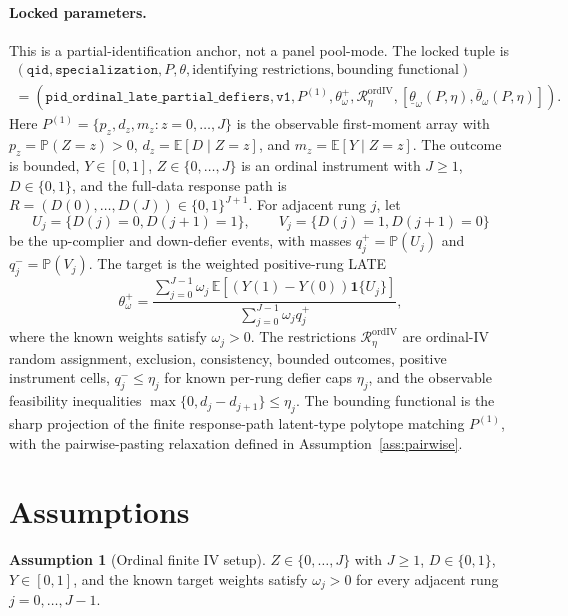 \documentclass[11pt]{article}
\newcommand{\E}{\mathbb{E}}
\renewcommand{\Pr}{\mathbb{P}}
\newcommand{\one}{\mathbf{1}}
\theoremstyle{definition}
\newtheorem{assumption}{Assumption}
\theoremstyle{plain}
\theoremstyle{remark}
\begin{document}
\paragraph{Locked parameters.}
This is a partial-identification anchor, not a panel pool-mode.  The locked
tuple is
\[
\begin{gathered}
(\texttt{qid},\texttt{specialization},P,\theta,\text{identifying restrictions},
  \text{bounding functional})\\
=
(\texttt{pid\_ordinal\_late\_partial\_defiers},\texttt{v1},
  P^{(1)},\theta^+_\omega,\mathcal R_{\eta}^{\mathrm{ordIV}},
  [\underline\theta_\omega(P,\eta),\overline\theta_\omega(P,\eta)]) .
\end{gathered}
\]
Here \(P^{(1)}=\{p_z,d_z,m_z:z=0,\ldots,J\}\) is the observable first-moment
array with \(p_z=\Pr(Z=z)>0\), \(d_z=\E[D\mid Z=z]\), and
\(m_z=\E[Y\mid Z=z]\).  The outcome is bounded, \(Y\in[0,1]\),
\(Z\in\{0,\ldots,J\}\) is an ordinal instrument with \(J\ge 1\),
\(D\in\{0,1\}\), and the full-data response path is
\(R=(D(0),\ldots,D(J))\in\{0,1\}^{J+1}\).  For adjacent rung \(j\), let
\[
U_j=\{D(j)=0,D(j+1)=1\},\qquad V_j=\{D(j)=1,D(j+1)=0\}
\]
be the up-complier and down-defier events, with masses \(q^+_j=\Pr(U_j)\) and
\(q^-_j=\Pr(V_j)\).  The target is the weighted positive-rung LATE
\[
\theta^+_\omega
=\frac{\sum_{j=0}^{J-1}\omega_j\,\E[(Y(1)-Y(0))\one\{U_j\}]}
        {\sum_{j=0}^{J-1}\omega_j q^+_j},
\]
where the known weights satisfy \(\omega_j>0\).  The restrictions
\(\mathcal R_{\eta}^{\mathrm{ordIV}}\) are ordinal-IV random assignment,
exclusion, consistency, bounded outcomes, positive instrument cells,
\(q^-_j\le \eta_j\) for known per-rung defier caps \(\eta_j\), and the
observable feasibility inequalities
\(\max\{0,d_j-d_{j+1}\}\le\eta_j\).  The bounding functional is the sharp
projection of the finite response-path latent-type polytope matching
\(P^{(1)}\), with the pairwise-pasting relaxation defined in
Assumption~\ref{ass:pairwise}.

\section{Assumptions}
\begin{assumption}[Ordinal finite IV setup]\label{ass:finite-ordinal}
\(Z\in\{0,\ldots,J\}\) with \(J\ge1\), \(D\in\{0,1\}\), \(Y\in[0,1]\), and
the known target weights satisfy \(\omega_j>0\) for every adjacent rung
\(j=0,\ldots,J-1\).
\end{assumption}
\end{document}
